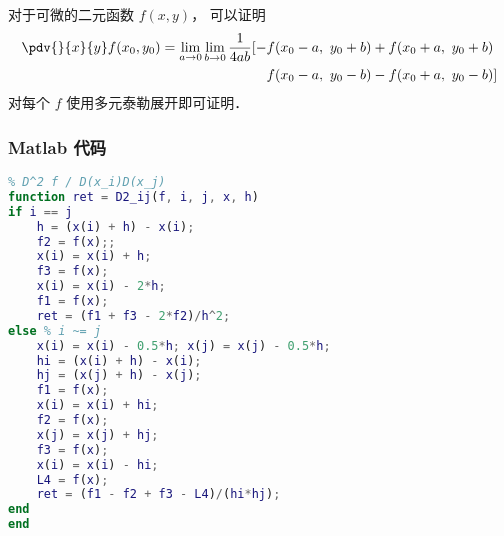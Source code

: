 
\begin{issues}
\issueDraft
\end{issues}


对于可微的二元函数 $f(x,y)$， 可以证明
\begin{equation}
\begin{aligned}
\pdv{}{x}{y} f(x_0,y_0) = \lim_{a\to 0}\lim_{b\to 0}\frac{1}{4ab}[-& f(x_0-a,\ y_0+b) + f(x_0+a,\  y_0+b)\\
& f(x_0-a,\  y_0-b) - f(x_0+a,\  y_0-b)]
\end{aligned}
\end{equation}
对每个 $f$ 使用多元泰勒展开即可证明．

\subsubsection{Matlab 代码}
\begin{lstlisting}[language=matlab, caption=D2\_ij.m]
% 数值二阶偏导
% D^2 f / D(x_i)D(x_j)
function ret = D2_ij(f, i, j, x, h)
if i == j
    h = (x(i) + h) - x(i);
    f2 = f(x);;
    x(i) = x(i) + h;
    f3 = f(x);
    x(i) = x(i) - 2*h;
    f1 = f(x);
    ret = (f1 + f3 - 2*f2)/h^2;
else % i ~= j
    x(i) = x(i) - 0.5*h; x(j) = x(j) - 0.5*h;
    hi = (x(i) + h) - x(i);
    hj = (x(j) + h) - x(j);
    f1 = f(x);
    x(i) = x(i) + hi;
    f2 = f(x);
    x(j) = x(j) + hj;
    f3 = f(x);
    x(i) = x(i) - hi;
    L4 = f(x);
    ret = (f1 - f2 + f3 - L4)/(hi*hj);
end
end
\end{lstlisting}
